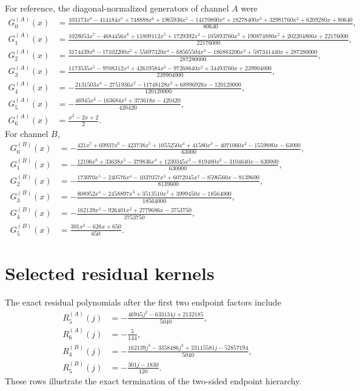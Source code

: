 \documentclass[11pt,a4paper]{article}
\begin{document}
For reference, the diagonal-normalized generators of channel $A$ were
\begin{align*}
G^{(A)}_0(x)&=\frac{103173x^8-414184x^7+748888x^6+1965936x^5-14170800x^4+18278400x^3+32981760x^2+6209280x+80640}{80640},\\
G^{(A)}_1(x)&=\frac{1028053x^7-4684456x^6+11809112x^5+1729392x^4-105893760x^3+190874880x^2+202204800x+22176000}{22176000},\\
G^{(A)}_2(x)&=\frac{3174439x^6-17102200x^5+55697320x^4-68565504x^3-186883200x^2+587341440x+287280000}{287280000},\\
G^{(A)}_3(x)&=\frac{1173535x^5-9708312x^4+42619584x^3-97268640x^2+34493760x+239904000}{239904000},\\
G^{(A)}_4(x)&=-\frac{2131503x^4-2751936x^3-11748128x^2+68996928x-120120000}{120120000},\\
G^{(A)}_5(x)&=-\frac{46945x^3-163684x^2+373618x-420420}{420420},\\
G^{(A)}_6(x)&=\frac{x^2-2x+2}{2}.
\end{align*}
For channel $B$,
\begin{align*}
G^{(B)}_0(x)&=-\frac{421x^7+69937x^6-423738x^5+1055250x^4+41580x^3-4071060x^2-1559880x-63000}{63000},\\
G^{(B)}_1(x)&=-\frac{12106x^6+33638x^5-379836x^4+1230345x^3-819480x^2-3104640x-630000}{630000},\\
G^{(B)}_2(x)&=-\frac{173070x^5-240576x^4-1037057x^3+6072045x^2-8596560x-8139600}{8139600},\\
G^{(B)}_3(x)&=-\frac{808952x^4-2458897x^3+3513510x^2+3999450x-18564000}{18564000},\\
G^{(B)}_4(x)&=-\frac{162139x^3-926401x^2+2779686x-3753750}{3753750},\\
G^{(B)}_5(x)&=\frac{301x^2-626x+650}{650}.
\end{align*}

\section{Selected residual kernels}

The exact residual polynomials after the first two endpoint factors include
\begin{align*}
R^{(A)}_5(j)&=-\frac{46945j^2-633134j+2132185}{5040},\\
R^{(A)}_6(j)&=-\frac{5}{144},\\
R^{(B)}_4(j)&=-\frac{162139j^3-3358486j^2+23115581j-52857194}{5040},\\
R^{(B)}_5(j)&=-\frac{301j-1830}{120}.
\end{align*}
These rows illustrate the exact termination of the two-sided endpoint hierarchy.
\end{document}
